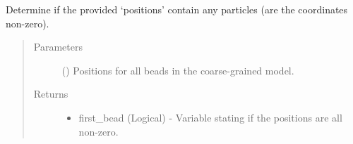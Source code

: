 \documentclass[letterpaper,12pt,english,openany,oneside]{sphinxmanual}
\begin{document}

\begin{fulllineitems}
\label{\detokenize{utilities:utilities.util.first_bead}}
Determine if the provided ‘positions’ contain any particles (are the coordinates non-zero).
\begin{quote}\begin{description}
\item[{Parameters}] \leavevmode
{} (\sphinxstyleliteralemphasis{\sphinxupquote{( }}\sphinxstyleliteralemphasis{\sphinxupquote{ ( }}\sphinxstyleliteralemphasis{\sphinxupquote{ ) }}\sphinxstyleliteralemphasis{\sphinxupquote{)}}) \textendash{} Positions for all beads in the coarse-grained model.

\item[{Returns}] \leavevmode
\begin{itemize}
\item {} 
first\_bead (Logical) - Variable stating if the positions are all non-zero.

\end{itemize}


\end{description}\end{quote}

\end{fulllineitems}

\end{document}
